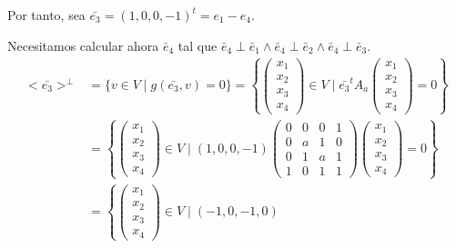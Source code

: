 \begin{ejercicio}
\begin{enumerate}
\begin{itemize}
            Por tanto, sea $\bar{e_3} = (1, 0, 0, -1)^t = e_1 - e_4$.

            Necesitamos calcular ahora $\bar{e}_4$ tal que $ \bar{e}_4\perp \bar{e}_1 \land \bar{e}_4\perp \bar{e}_2 \land \bar{e}_4\perp \bar{e}_3$.
            \begin{equation*}\begin{split}
                <\bar{e_3}>^\perp &= \{v \in V \mid g(\bar{e_3},v) = 0\} 
                = \left\{ \left(\begin{array}{c}
                     x_1 \\ x_2 \\ x_3 \\ x_4
                \end{array} \right) \in V \mid \bar{e_3}^t A_a
                \left(\begin{array}{c}
                     x_1 \\ x_2 \\ x_3 \\x_4
                \end{array} \right) = 0\right\} \\
                &= \left\{ \left(\begin{array}{c}
                     x_1 \\ x_2 \\ x_3 \\ x_4
                \end{array} \right) \in V \mid (1, 0, 0, -1) \left(\begin{array}{cccc}
                    0 & 0 & 0 & 1 \\
                    0 & a & 1 & 0 \\
                    0 & 1 & a & 1 \\
                    1 & 0 & 1 & 1
                \end{array} \right) 
                \left(\begin{array}{c}
                     x_1 \\ x_2 \\ x_3 \\x_4
                \end{array} \right) = 0\right\} \\
                &= \left\{ \left(\begin{array}{c}
                     x_1 \\ x_2 \\ x_3 \\x_4
                \end{array} \right) \in V \mid (-1, 0, -1, 0)

\end{split}
\end{equation*}
\end{itemize}
\end{enumerate}
\end{ejercicio}
